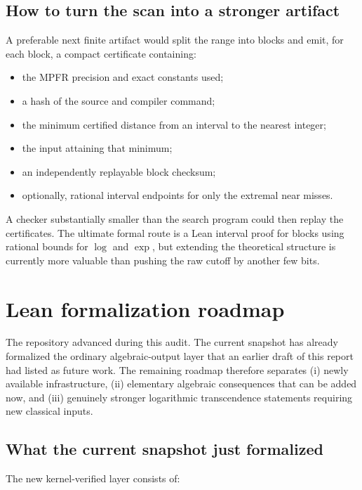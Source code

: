 \documentclass[11pt,oneside]{article}
\theoremstyle{definition}
\theoremstyle{remark}
\begin{document}
\subsection{How to turn the scan into a stronger artifact}

A preferable next finite artifact would split the range into blocks and emit, for each block,
a compact certificate containing:

\begin{itemize}
\item the MPFR precision and exact constants used;
\item a hash of the source and compiler command;
\item the minimum certified distance from an interval to the nearest integer;
\item the input attaining that minimum;
\item an independently replayable block checksum;
\item optionally, rational interval endpoints for only the extremal near misses.
\end{itemize}

A checker substantially smaller than the search program could then replay the certificates.
The ultimate formal route is a Lean interval proof for blocks using rational bounds for
$\log$ and $\exp$, but extending the theoretical structure is currently more valuable than
pushing the raw cutoff by another few bits.

\section{Lean formalization roadmap}\label{sec:lean-roadmap}

The repository advanced during this audit.  The current snapshot has already formalized the
ordinary algebraic-output layer that an earlier draft of this report had listed as future
work.  The remaining roadmap therefore separates (i) newly available infrastructure,
(ii) elementary algebraic consequences that can be added now, and (iii) genuinely stronger
logarithmic transcendence statements requiring new classical inputs.

\subsection{What the current snapshot just formalized}

The new kernel-verified layer consists of:
\end{document}
